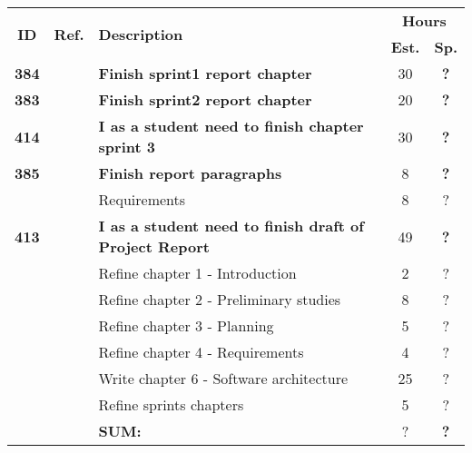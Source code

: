   \label{tab:sprint4stories}
 \def\arraystretch{1.25}
 
\begin{longtable}{ccXcc}

\toprule[0.5mm]
\multirow{2}{*}{\textbf{ID}} &
\multirow{2}{*}{\textbf{Ref.}} & \multirow{2}{*}{\textbf{Description}} & \multicolumn{2}{c}{\textbf{Hours}} \\
 					& & & \textbf{Est.} & \textbf{Sp.} \\
\midrule

\textbf{384} 	&
	& {\bf Finish sprint1 report chapter} 	
	& 30
	& \textbf{?} \\
	
\textbf{383} 	& 
	& {\bf Finish sprint2 report chapter} 	
	& 20
	& \textbf{?} \\

\textbf{414} 	&
	& {\bf I as a student need to finish  chapter sprint 3} 	
	& 30
	& \textbf{?} \\

\textbf{385} 	&
	& {\bf Finish report paragraphs} 	
	& 8	
	& \textbf{?} \\
		&& Requirements	& 8 & ? \\
\textbf{413} 	& 
	& {\bf I as a student need to finish draft of Project Report} 	
	& 49
	& \textbf{?} \\
	&& Refine chapter 1 - Introduction & 2 & ?\\
	&& Refine chapter 2 - Preliminary studies & 8 & ?\\
	&& Refine chapter 3 - Planning & 5 & ?\\
	&& Refine chapter 4 - Requirements & 4 & ?\\
	&& Write chapter 6 - Software architecture & 25 & ?\\
	&& Refine sprints chapters & 5 & ?\\

\midrule
		
				&& \textbf{SUM:}		&		?	& \textbf{?}
 \\																			
\bottomrule[0.5mm]
\end{longtable}
